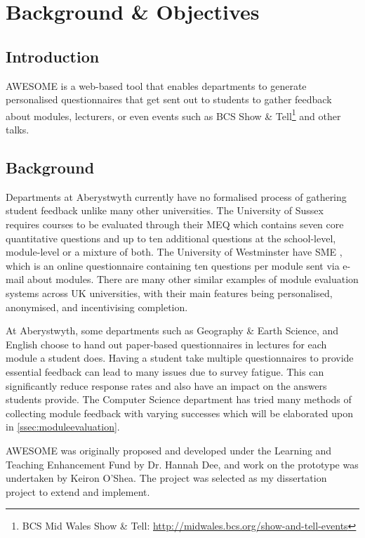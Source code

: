 \chapter{Background \& Objectives}

	\section{Introduction}
	\label{sec:background}
	
	\acf{AWESOME} is a web-based tool that enables departments to generate personalised questionnaires that get sent out to students to gather feedback about modules, lecturers, or even events such as BCS Show \& Tell\footnote{BCS Mid Wales Show \& Tell: \url{http://midwales.bcs.org/show-and-tell-events}} and other talks.
	
	\section{Background}

	Departments at Aberystwyth currently have no formalised process of gathering student feedback unlike many other universities.
	The University of Sussex requires courses to be evaluated through their \ac{MEQ} \cite{meq} which contains seven core quantitative questions and up to ten additional questions at the school-level, module-level or a mixture of both.
	The University of Westminster have \ac{SME} \cite{sme}, which is an online questionnaire containing ten questions per module sent via e-mail about modules.
	There are many other similar examples of module evaluation systems across UK universities, with their main features being personalised, anonymised, and incentivising completion.
	
	At Aberystwyth, some departments such as Geography \& Earth Science, and English choose to hand out paper-based questionnaires in lectures for each module a student does.
	Having a student take multiple questionnaires to provide essential feedback can lead to many issues due to survey fatigue.
	This can significantly reduce response rates and also have an impact on the answers students provide.
	The Computer Science department has tried many methods of collecting module feedback with varying successes which will be elaborated upon in \autoref{ssec:moduleevaluation}.

	\ac{AWESOME} was originally proposed and developed under the Learning and Teaching Enhancement Fund by Dr. Hannah Dee, and work on the prototype was undertaken by Keiron O'Shea.
	The project was selected as my dissertation project to extend and implement.
	
